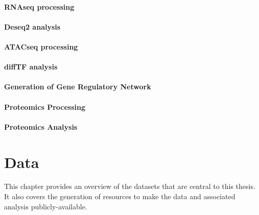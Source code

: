 \documentclass[11pt, a4paper, twosided]{book}
\begin{document}
\hypertarget{rnaseq-processing}{%
\subsubsection{RNAseq processing}\label{rnaseq-processing}}

\hypertarget{deseq2-analysis}{%
\subsubsection{Deseq2 analysis}\label{deseq2-analysis}}

\hypertarget{atacseq-processing-1}{%
\subsubsection{ATACseq processing}\label{atacseq-processing-1}}

\hypertarget{difftf-analysis}{%
\subsubsection{diffTF analysis}\label{difftf-analysis}}

\hypertarget{generation-of-gene-regulatory-network}{%
\subsubsection{Generation of Gene Regulatory Network}\label{generation-of-gene-regulatory-network}}

\hypertarget{proteomics-processing}{%
\subsubsection{Proteomics Processing}\label{proteomics-processing}}

\hypertarget{proteomics-analysis}{%
\subsubsection{Proteomics Analysis}\label{proteomics-analysis}}

\hypertarget{data}{%
\chapter{Data}\label{data}}

This chapter provides an overview of the datasets that are central to this thesis. It also covers the generation of resources to make the data and associated analysis publicly-available.
\end{document}
